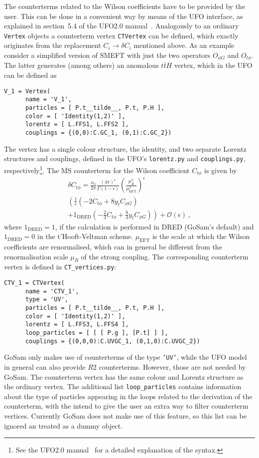 \documentclass[11pt,a4paper]{refrep}
\newcommand{\gosam}{{\sc GoSam}\xspace}
\begin{document}
The counterterms related to the Wilson coefficients have to be provided by the user. This can be done in a convenient way by means of the UFO interface, as explained in section~5.4 of the UFO2.0 manual~\cite{Darme:2023jdn}. Analogously to an ordinary \texttt{Vertex} objects a counterterm vertex \texttt{CTVertex} can be defined, which exactly originates from the replacement $C_i\to \delta C_i$ mentioned above. As an example consider a simplified version of SMEFT with just the two operators $O_{\phi G}$ and $O_{t\phi}$. The latter generates (among others) an anomalous $t\bar{t}H$ vertex, which in the UFO can be defined as
\begin{lstlisting}[gobble=3,%
     basicstyle=\ttfamily]
   V_1 = Vertex(
      name = 'V_1',
      particles = [ P.t__tilde__, P.t, P.H ],
      color = [ 'Identity(1,2)' ],
      lorentz = [ L.FFS1, L.FFS2 ],
      couplings = {(0,0):C.GC_1, (0,1):C.GC_2})
\end{lstlisting}
The vertex has a single colour structure, the identity, and two separate Lorentz structures and couplings, defined in the UFO's \texttt{lorentz.py} and \texttt{couplings.py}, respectively\footnote{See the UFO2.0 manual~\cite{Darme:2023jdn} for a detailed explanation of the syntax.}. The $\overline{\text{MS}}$ counterterm for the Wilson coefficient $C_{t\phi}$ is given by
\begin{multline}\label{eq:Ctphi_CT}
   \delta C_{t\phi} = \frac{\alpha_s}{2\pi}\frac{(4\pi)^\epsilon}{\Gamma(1-\epsilon)}\left(\frac{\mu_R^2}{\mu_\mathrm{EFT}^2}\right)^\epsilon\\\left(\frac{1}{\epsilon}\left(-2C_{t\phi}+8y_tC_{\phi G}\right)\right. \\+ \left.1_\mathrm{DRED}\left(-\frac{2}{3}C_{t\phi}+\frac{8}{3}y_tC_{\phi G}\right)\right) + \mathcal{O}(\epsilon)\,,
\end{multline}
where $1_\mathrm{DRED}=1$, if the calculation is performed in DRED (\gosam's default) and $1_\mathrm{DRED}=0$ in the t'Hooft-Veltman scheme. $\mu_\mathrm{EFT}$ is the scale at which the Wilson coefficients are renormalised, which can in general be different from the renormalisation scale $\mu_R$ of the strong coupling. The corresponding counterterm vertex is defined in \texttt{CT\_vertices.py}:
\begin{lstlisting}[gobble=3,%
     basicstyle=\ttfamily]
   CTV_1 = CTVertex(
      name = 'CTV_1',
      type = 'UV',
      particles = [ P.t__tilde__, P.t, P.H ],
      color = [ 'Identity(1,2)' ],
      lorentz = [ L.FFS3, L.FFS4 ],
      loop_particles = [ [ [ P.g ], [P.t] ] ],
      couplings = {(0,0,0):C.UVGC_1, (0,1,0):C.UVGC_2})
\end{lstlisting}
\gosam only makes use of counterterms of the type \texttt{'UV'}, while the UFO model in general can also provide $R2$ counterterms. However, those are not needed by \gosam. The counterterm vertex has the same colour and Lorentz structure as the ordinary vertex. The additional list \texttt{loop\_particles} contains information about the type of particles appearing in the loops related to the derivation of the counterterm, with the intend to give the user an extra way to filter counterterm vertices. Currently \gosam does not make use of this feature, so this list can be ignored an treated as a dummy object.
\end{document}
